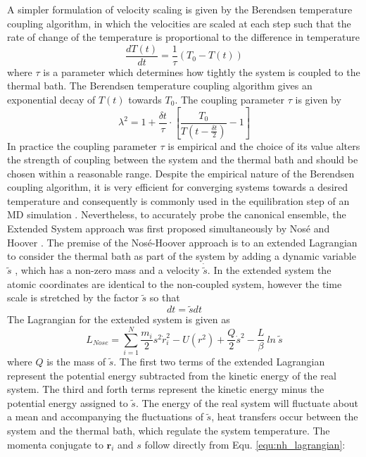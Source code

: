 %
%
A simpler formulation of velocity scaling is given by the Berendsen temperature coupling algorithm, in which the velocities are scaled at each step such that the rate of change of the temperature is proportional to the difference in temperature
%
%
\begin{equation}
\frac{dT(t)}{dt} = \frac{1}{\tau}(T_{0}-T(t))
\end{equation}
%
%
where $ \tau $ is a parameter which determines how tightly the system is coupled to the thermal bath. The Berendsen temperature coupling algorithm gives an exponential decay of $ T(t) $ towards $ T_{0} $. The coupling parameter $ \tau $ is given by
%
%
\begin{equation}
\lambda^{2} = 1 + \frac{\delta t}{\tau}\cdot \left[ \frac{T_{0}}{T(t-\frac{\delta t}{2})} -1 \right]
\end{equation}
%
%
In practice the coupling parameter $\tau$ is empirical and the choice of its value alters the strength of coupling between the system and the thermal bath and should be chosen within a reasonable range. Despite the empirical nature of the Berendsen coupling algorithm, it is very efficient for converging systems towards a desired temperature and consequently is commonly used in the equilibration step of an MD simulation \cite{frenkel2001understanding}. Nevertheless, to accurately probe the canonical ensemble, the Extended System approach was first proposed simultaneously by Nos\'{e} \cite{nose1984unified} and Hoover \cite{hoover1985canonical}. The premise of the Nos\'{e}-Hoover approach is to an extended Lagrangian to consider the thermal bath as part of the system by adding a dynamic variable $\tilde{s}$ , which has a non-zero mass and a velocity $\dot{\tilde{s}}$. In the extended system the atomic coordinates are identical to the non-coupled system, however the time scale is stretched by the factor $\tilde{s}$ so that
%
%
\begin{equation}
dt=\tilde{s}dt 
\end{equation}
%
%
The Lagrangian for the extended system is given as
%
%
\begin{equation}
L_{Nose} = \sum_{i=1}^{N}\frac{m_{i}}{2}s^{2}\dot{r}_{i}^{2}-U(r^{2}) + \frac{Q}{2}\dot{s}^{2}  - \frac{L}{\beta} \: ln \: \tilde{s}
\label{equ:nh_lagrangian}
\end{equation}
%
%
where $Q$ is the mass of $\tilde{s}$. The first two terms of the extended Lagrangian represent the potential energy subtracted from the kinetic energy of the real system. The third and forth terms represent the kinetic energy minus the potential energy assigned to $\tilde{s}$. The energy of the real system will fluctuate about a mean and accompanying the fluctuations of $\tilde{s}$, heat transfers occur between the system and the thermal bath, which regulate the system temperature. The momenta conjugate to $\mathbf{r}_{i}$ and $s$ follow directly from Equ. \ref{equ:nh_lagrangian}:

